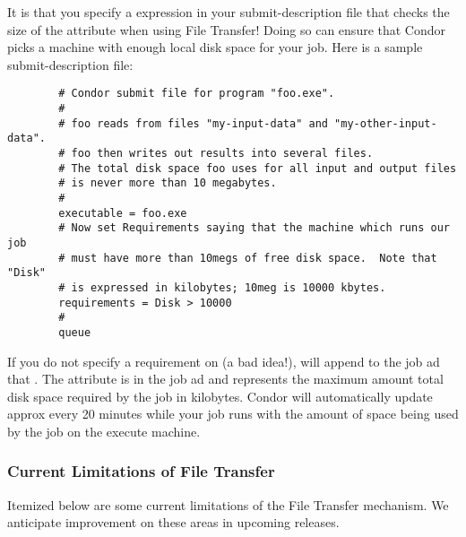 It is  that you specify a 
expression in your submit-description file that checks the size of the
 attribute when using File Transfer!  Doing so can ensure
that Condor picks a machine with enough local disk space for your job.
Here is a sample submit-description file:

\begin{verbatim}
        # Condor submit file for program "foo.exe".
        #
        # foo reads from files "my-input-data" and "my-other-input-data".
        # foo then writes out results into several files.
        # The total disk space foo uses for all input and output files
        # is never more than 10 megabytes.
        #
        executable = foo.exe
        # Now set Requirements saying that the machine which runs our job
        # must have more than 10megs of free disk space.  Note that "Disk"
        # is expressed in kilobytes; 10meg is 10000 kbytes.
        requirements = Disk > 10000
        # 
        queue
\end{verbatim}

If you do not specify a requirement on  (a bad idea!),
 will append to the job ad  that
.  The  attribute is in the
job ad and represents the maximum amount total disk space required by the
job in kilobytes.  Condor will automatically update 
approx every 20 minutes while your job runs with the amount of space being
used by the job on the execute machine.  

\subsubsection{Current Limitations of File Transfer}

Itemized below are some current limitations of the File Transfer mechanism.  We
anticipate improvement on these areas in upcoming releases.

